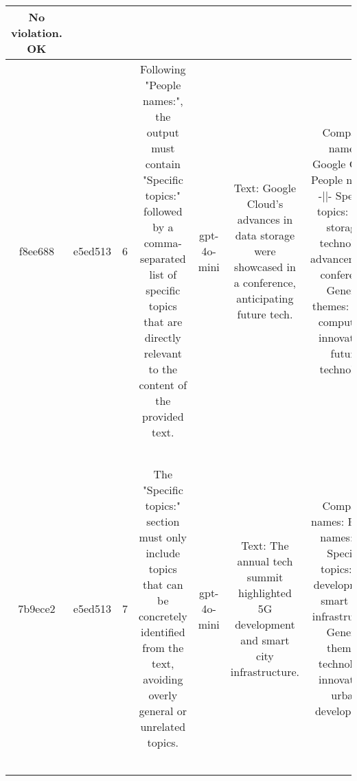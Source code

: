 \begin{table}[h!]
\begin{tabular}{|c|c|c|c|c|c|c|c|c|c|}
No violation.
OK & \\
\hline
f8ee688 & e5ed513 & 6 & Following "People names:", the output must contain "Specific topics:" followed by a comma-separated list of specific topics that are directly relevant to the content of the provided text. & gpt-4o-mini & Text: Google Cloud's advances in data storage were showcased in a conference, anticipating future tech. & Company names: Google Cloud
People names: -||-
Specific topics: data storage, technology advancements, conference
General themes: cloud computing, innovation, future technology & ok & The chatbot has followed the required format by providing outputs under the categories "Company names", "People names", "Specific topics", and "General themes". Each category is presented as a comma-separated list as specified. 

For rule compliance: 
- The category "Company names" is correctly populated with a company name.
- The category "People names" is filled with "-||-", which is consistent with the placeholder format for no entries.
- The category "Specific topics" is populated with appropriate topics.
- The category "General themes" is populated as well.

Therefore, based on format adherence, the output appears to comply with the described structure for presenting extracted entities and topics.

No violation.
OK & \\
\hline
7b9ece2 & e5ed513 & 7 & The "Specific topics:" section must only include topics that can be concretely identified from the text, avoiding overly general or unrelated topics. & gpt-4o-mini & Text: The annual tech summit highlighted 5G development and smart city infrastructure. & Company names: 
People names: -||-
Specific topics: 5G development, smart city infrastructure
General themes: technology, innovation, urban development & err & Upon evaluating the chatbot's output against the description, I noticed the following:

1. The "Company names" field is empty, which directly violates the instruction to extract all company names mentioned in the text. Since there is no content, it implies non-compliance with the format requirement, even without knowing the input.

2. The format for "People names" and other fields is correct in structure and follows the format "<comma_separated_list_of_entities>". However, whether the "Specific topics" and the "General themes" are correct and complete would require knowing the input.


\end{tabular}
\end{table}
